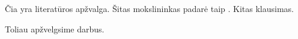Čia yra literatūros apžvalga. Šitas mokslininkas padarė taip \cite{horvath2016}.
%
Kitas klausimas.

Toliau apžvelgsime \cite{ezhov1969} darbus.
